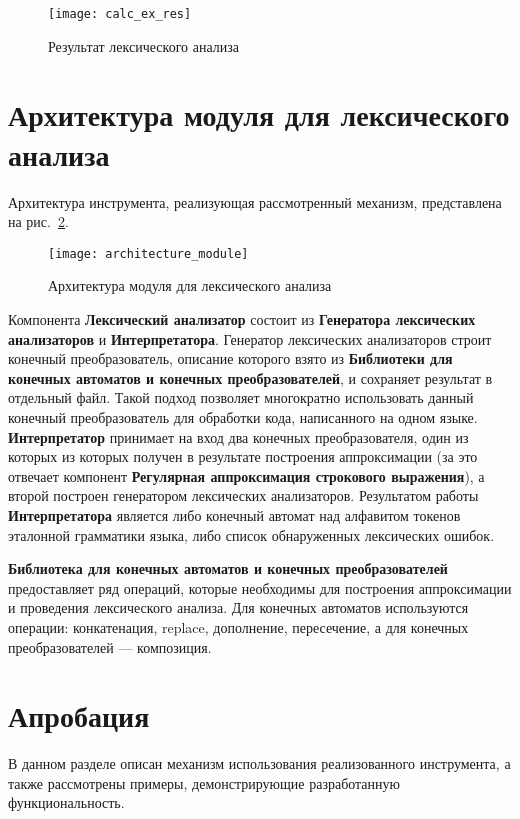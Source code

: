 \documentclass[10pt, conference, compsocconf]{IEEEtran}
\begin{document}
\begin{figure}[H]
\centering
\texttt{[image: calc\_ex\_res]}
\caption{Результат лексического анализа }
\label{fig:calc_ex_res}
\end{figure}

\section{Архитектура модуля для лексического анализа}
Архитектура инструмента, реализующая рассмотренный механизм, представлена на рис.~\ref{fig:ComponentDiagram_rus}. 

\begin{figure}[H]
\centering
\texttt{[image: architecture\_module]}
\caption{Архитектура модуля для лексического анализа}
\label{fig:ComponentDiagram_rus}
\end{figure}

Компонента \textbf{Лексический анализатор} состоит из \textbf{Генератора лексических анализаторов} и \textbf{Интерпретатора}. Генератор лексических анализаторов строит конечный преобразователь, описание которого взято из \textbf{Библиотеки для конечных автоматов и конечных преобразователей}, и сохраняет результат в отдельный файл. Такой подход позволяет многократно использовать данный конечный преобразователь для обработки кода, написанного на одном языке. \textbf{Интерпретатор} принимает на вход два конечных преобразователя, один из которых из которых получен в результате построения аппроксимации (за это отвечает компонент \textbf{Регулярная аппроксимация строкового выражения}), а второй построен генератором лексических анализаторов. Результатом работы \textbf{Интерпретатора} является либо конечный автомат над алфавитом токенов эталонной грамматики языка, либо список обнаруженных лексических ошибок. 

\textbf{Библиотека для конечных автоматов и конечных преобразователей} предоставляет ряд операций, которые необходимы для построения аппроксимации и проведения лексического анализа. Для конечных автоматов используются операции: конкатенация, replace, дополнение, пересечение,  а для конечных преобразователей --- композиция. 

\section{Апробация}

В данном разделе описан механизм использования реализованного инструмента, а также рассмотрены примеры, демонстрирующие разработанную функциональность.
\end{document}
